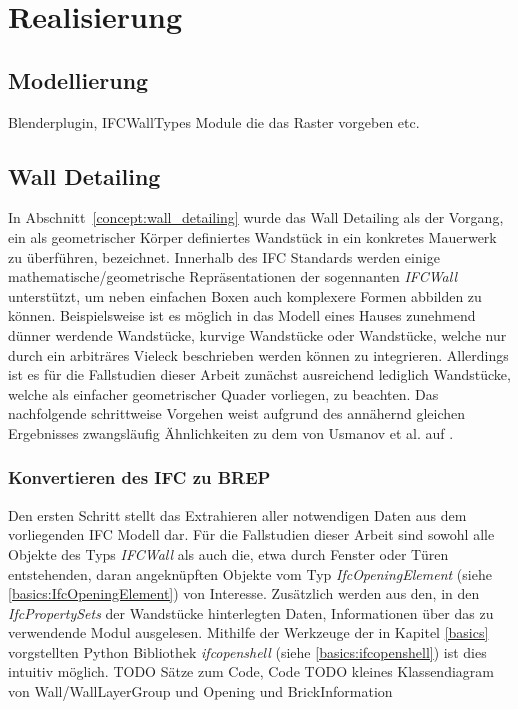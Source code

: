 \chapter{Realisierung}
\section{Modellierung}
Blenderplugin, IFCWallTypes Module die das Raster vorgeben etc.

\section{Wall Detailing}
In Abschnitt~\ref{concept:wall_detailing} wurde das Wall Detailing als der Vorgang, ein als geometrischer Körper definiertes Wandstück in ein konkretes Mauerwerk zu überführen, bezeichnet.
Innerhalb des IFC Standards werden einige mathematische/geometrische Repräsentationen der sogennanten \textit{IFCWall} unterstützt, um neben einfachen Boxen auch komplexere Formen abbilden zu können.
Beispielsweise ist es möglich in das Modell eines Hauses zunehmend dünner werdende Wandstücke, kurvige Wandstücke oder Wandstücke, welche nur durch ein arbiträres Vieleck beschrieben werden können zu integrieren.
Allerdings ist es für die Fallstudien dieser Arbeit zunächst ausreichend lediglich Wandstücke, welche als einfacher geometrischer Quader vorliegen, zu beachten.
Das nachfolgende schrittweise Vorgehen weist aufgrund des annähernd gleichen Ergebnisses zwangsläufig Ähnlichkeiten zu dem von Usmanov et al. auf \cite{Usmanov2021}.

\subsection{Konvertieren des IFC zu BREP}
Den ersten Schritt stellt das Extrahieren aller notwendigen Daten aus dem vorliegenden IFC Modell dar.
Für die Fallstudien dieser Arbeit sind sowohl alle Objekte des Typs \textit{IFCWall} als auch die, etwa durch Fenster oder Türen entstehenden, daran angeknüpften Objekte vom Typ \textit{IfcOpeningElement} (siehe \ref{basics:IfcOpeningElement}) von Interesse.
Zusätzlich werden aus den, in den \textit{IfcPropertySets} der Wandstücke hinterlegten Daten, Informationen über das zu verwendende Modul ausgelesen.
Mithilfe der Werkzeuge der in Kapitel \ref{basics} vorgstellten Python Bibliothek \textit{ifcopenshell} (siehe \ref{basics:ifcopenshell}) ist dies intuitiv möglich.
TODO Sätze zum Code, Code TODO kleines Klassendiagram von Wall/WallLayerGroup und Opening und BrickInformation

